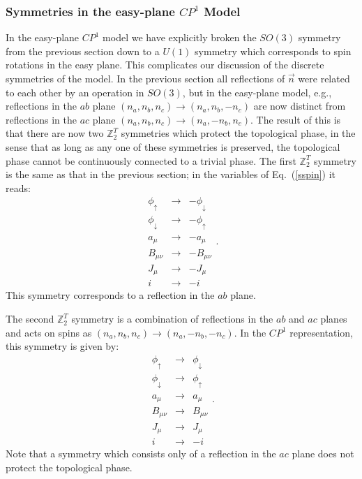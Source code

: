 \documentclass[prb,twocolumn]{revtex4-1}
\def\ztwot{\mathbb{Z}_2^T}
\newcommand{\cp}{$CP^1$ }
\begin{document}
\subsubsection{Symmetries in the easy-plane \cp Model}
In the easy-plane \cp model we have explicitly broken the $SO(3)$ symmetry from the previous section down to a $U(1)$ symmetry which corresponds to spin rotations in the easy plane. 
This complicates our discussion of the discrete symmetries of the model. In the previous section all reflections of $\vec{n}$ were related to each other by an operation in $SO(3)$, but in the easy-plane model, e.g., reflections in the $ab$ plane $(n_a, n_b, n_c) \to (n_a, n_b, -n_c)$ are now distinct from reflections in the $ac$ plane $(n_a, n_b, n_c) \to (n_a, -n_b, n_c)$. The result of this is that there are now two $\ztwot$ symmetries which protect the topological phase, in the sense that as long as any one of these symmetries is preserved, the topological phase cannot be continuously connected to a trivial phase. 
The first $\ztwot$ symmetry is the same as that in the previous section; in the variables of Eq.~(\ref{sspin}) it reads:
\begin{equation}
\begin{array}{ccc}
 \phi_\uparrow&\rightarrow& -\phi_\downarrow \\
\phi_\downarrow&\rightarrow &-\phi_\uparrow \\
a_\mu&\rightarrow & -a_\mu \\
B_{\mu\nu}&\rightarrow & -B_{\mu\nu}\\
J_\mu &\rightarrow &-J_\mu \\
i & \rightarrow & -i
\end{array}.
\label{z2}
\end{equation}
This symmetry corresponds to a reflection in the $ab$ plane.

The second $\ztwot$ symmetry is a combination of reflections in the $ab$ and $ac$ planes and acts on spins as $(n_a, n_b, n_c) \to (n_a, -n_b, -n_c)$. In the \cp representation, this symmetry is given by:
\begin{equation}
\begin{array}{ccc}
 \phi_\uparrow&\rightarrow& \phi_\downarrow \\
\phi_\downarrow&\rightarrow &\phi_\uparrow \\
a_\mu&\rightarrow & a_\mu \\
B_{\mu\nu}&\rightarrow & B_{\mu\nu}\\
J_\mu &\rightarrow &J_\mu \\
i & \rightarrow & -i
\end{array}.
\label{z22}
\end{equation}
Note that a symmetry which consists only of a reflection in the $ac$ plane does not protect the topological phase. 
\end{document}
